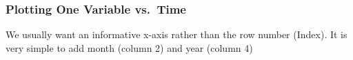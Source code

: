 \documentclass[10pt]{beamer}
\begin{document}
\begin{frame}[fragile]
\frametitle{Plotting One Variable vs.~Time}

\vspace{2ex} 

{\scriptsize We usually want an informative x-axis rather than the row
  number (Index).  It is very simple to add month (column 2) and year
  (column 4)\\}

\vspace*{-1ex}
\begin{center}
\end{center}
\end{frame}
\end{document}
